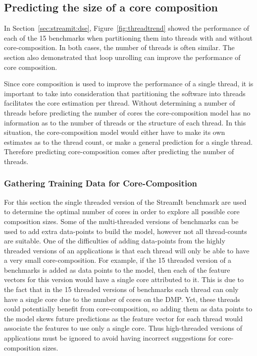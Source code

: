 \subsection{Predicting the size of a core composition}
In Section~\ref{sec:streamit:dse}, Figure~\ref{fig:threadtrend} showed the performance of each of the 15 benchmarks when partitioning them into threads with and without core-composition.
In both cases, the number of threads is often similar.
The section also demonstrated that loop unrolling can improve the performance of core composition.

Since core composition is used to improve the performance of a single thread, it is important to take into consideration that partitioning the software into threads facilitates the core estimation per thread.
Without determining a number of threads before predicting the number of cores the core-composition model has no information as to the number of threads or the structure of each thread.
In this situation, the core-composition model would either have to make its own estimates as to the thread count, or make a general prediction for a single thread.
Therefore predicting core-composition comes after predicting the number of threads.

\subsubsection{Gathering Training Data for Core-Composition}
For this section the single threaded version of the StreamIt benchmark are used to determine the optimal number of cores in order to explore all possible core composition sizes.
Some of the multi-threaded versions of benchmarks can be used to add extra data-points to build the model, however not all thread-counts are suitable.
One of the difficulties of adding data-points from the highly threaded versions of an applications is that each thread will only be able to have a very small core-composition.
For example, if the 15 threaded version of a benchmarks is added as data points to the model, then each of the feature vectors for this version would have a single core attributed to it.
This is due to the fact that in the 15 threaded versions of benchmarks each thread can only have a single core due to the number of cores on the DMP.
Yet, these threads could potentially benefit from core-composition, so adding them as data points to the model skews future predictions as the feature vector for each thread would associate the features to use only a single core.
Thus high-threaded versions of applications must be ignored to avoid having incorrect suggestions for core-composition sizes.


